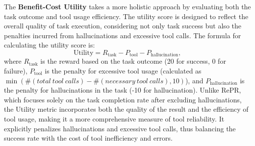 The \textbf{Benefit-Cost Utility} takes a more holistic approach by evaluating both the task outcome and tool usage efficiency. The utility score is designed to reflect the overall quality of task execution, considering not only task success but also the penalties incurred from hallucinations and excessive tool calls. The formula for calculating the utility score is:
$$
\text{Utility} = R_{\text{task}} - P_{\text{tool}} - P_{\text{hallucination}},
$$
where \( R_{\text{task}} \) is the reward based on the task outcome (20 for success, 0 for failure), \( P_{\text{tool}} \) is the penalty for excessive tool usage (calculated as \( \min( \#(total\ tool\ calls) - \#(necessary\ tool\ calls), 10) \)), and \( P_{\text{hallucination}} \) is the penalty for hallucinations in the task (-10 for hallucination). 
Unlike RePR, which focuses solely on the task completion rate after excluding hallucinations, the Utility metric incorporates both the quality of the result and the efficiency of tool usage, making it a more comprehensive measure of tool reliability. It explicitly penalizes hallucinations and excessive tool calls, thus balancing the success rate with the cost of tool inefficiency and errors.













